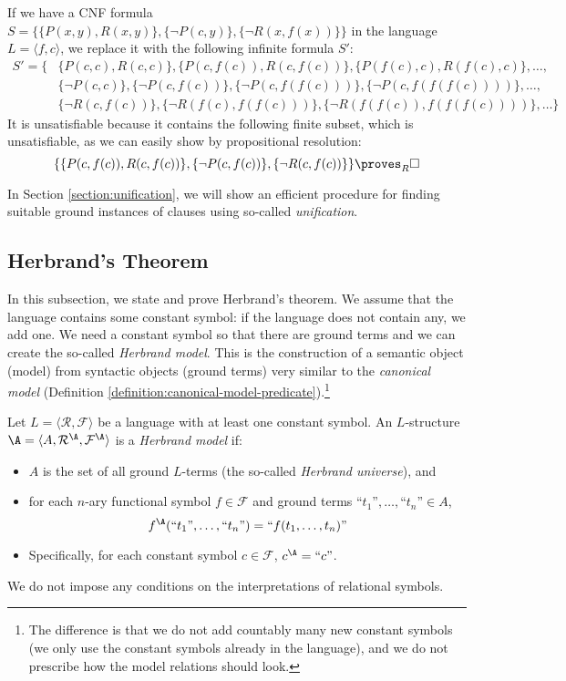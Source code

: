 \begin{example}
If we have a CNF formula $S=\{\{P(x,y),R(x,y)\},\{\neg P(c,y)\},\{\neg R(x,f(x))\}\}$ in the language $L=\langle f,c\rangle$, we replace it with the following infinite formula $S'$:
\begin{align*}
    S'=\{&\{P(c,c),R(c,c)\},\{P(c,f(c)),R(c,f(c))\},\{P(f(c),c),R(f(c),c)\},\dots,\\ 
    &\{\neg P(c,c)\}, \{\neg P(c,f(c))\},\{\neg P(c,f(f(c)))\},\{\neg P(c,f(f(f(c))))\}, \dots,\\
    &\{\neg R(c,f(c))\}, \{\neg R(f(c),f(f(c)))\},\{\neg R(f(f(c)),f(f(f(c))))\},\dots\}    
\end{align*}
It is unsatisfiable because it contains the following finite subset, which is unsatisfiable, as we can easily show by propositional resolution:
$$
\{\{P(c,f(c)),R(c,f(c))\},\{\neg P(c,f(c))\},\{\neg R(c,f(c))\}\}\proves_R\square
$$
\end{example}
In Section \ref{section:unification}, we will show an efficient procedure for finding suitable ground instances of clauses using so-called \emph{unification}.

\subsection{Herbrand's Theorem}

In this subsection, we state and prove Herbrand's theorem. We assume that the language contains some constant symbol: if the language does not contain any, we add one. We need a constant symbol so that there are ground terms and we can create the so-called \emph{Herbrand model}. This is the construction of a semantic object (model) from syntactic objects (ground terms) very similar to the \emph{canonical model} (Definition \ref{definition:canonical-model-predicate}).\footnote{The difference is that we do not add countably many new constant symbols (we only use the constant symbols already in the language), and we do not prescribe how the model relations should look.}

\begin{definition}
Let $L=\langle\mathcal R,\mathcal F\rangle$ be a language with at least one constant symbol. An $L$-structure $\A=\langle A,\mathcal R^\A,\mathcal F^\A\rangle$ is a \emph{Herbrand model} if:
\begin{itemize}
    \item $A$ is the set of all ground $L$-terms (the so-called \emph{Herbrand universe}), and
    \item for each $n$-ary functional symbol $f\in\mathcal F$ and ground terms $\text{``$t_1$''},\dots,\text{``$t_n$''}\in A$,
    $$
    f^\A(\text{``$t_1$''},\dots,\text{``$t_n$''})=\text{``$f(t_1,\dots,t_n)$''}
    $$
    \item Specifically, for each constant symbol $c\in\mathcal F$, $c^\A=\text{``$c$''}$.
\end{itemize}
We do not impose any conditions on the interpretations of relational symbols.
\end{definition}

